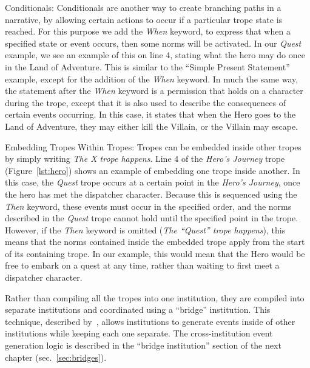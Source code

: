 \documentclass[11pt]{report}
\begin{document}
\begin{compactdesc}
\item[Conditionals:]
Conditionals are another way to create branching paths in a narrative, by allowing certain actions to occur if a particular trope state is reached. For this purpose we add the \emph{When} keyword, to express that when a specified state or event occurs, then some norms will be activated. In our \emph{Quest} example, we see an example of this on line 4, stating what the hero may do once in the Land of Adventure. This is similar to the ``Simple Present Statement'' example, except for the addition of the \emph{When} keyword. In much the same way, the statement after the \emph{When} keyword is a permission that holds on a character during the trope, except that it is also used to describe the consequences of certain events occurring. In this case, it states that when the Hero goes to the Land of Adventure, they may either kill the Villain, or the Villain may escape.

\item[Embedding Tropes Within Tropes:]
Tropes can be embedded inside other tropes by simply writing \emph{The X trope happens}.
Line 4 of the \emph{Hero's Journey} trope (Figure~\ref{lst:hero}) shows an example of embedding one trope inside another. In this case, the \emph{Quest} trope occurs at a certain point in the \emph{Hero's Journey}, once the hero has met the dispatcher character. Because this is sequenced using the \emph{Then} keyword, these events must occur in the specified order, and the norms described in the \emph{Quest} trope cannot hold until the specified point in the trope. However, if the \emph{Then} keyword is omitted (\emph{The ``Quest'' trope happens}), this means that the norms contained inside the embedded trope apply from the start of its containing trope. In our example, this would mean that the Hero would be free to embark on a quest at any time, rather than waiting to first meet a dispatcher character.

Rather than compiling all the tropes into one institution, they are compiled
into separate institutions and coordinated using a ``bridge'' institution. This
technique, described by~\citep{bath45254}, allows institutions to generate
events inside of other institutions while keeping each one separate. The
cross-institution event generation logic is described in the ``bridge institution''
section of the next chapter (sec.~\ref{sec:bridges}).
\end{compactdesc}
\end{document}

